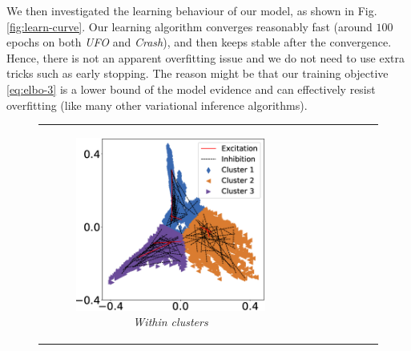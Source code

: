 We then investigated the learning behaviour of our model, as shown in Fig. \ref{fig:learn-curve}. Our learning algorithm converges reasonably fast (around $100$ epochs on both \textit{UFO} and \textit{Crash}), and then keeps stable after the convergence. Hence, there is not an apparent overfitting issue and we do not need to use extra tricks such as early stopping. The reason might be that our training objective \eqref{eq:elbo-3} is a lower bound of the model evidence and can effectively resist overfitting (like many other variational inference algorithms). 
\begin{figure}
	\vspace{-0.1in}
	\centering
	\setlength\tabcolsep{0.01pt}
	\begin{tabular}[c]{cc}
		\begin{subfigure}[t]{0.23\textwidth}
			\includegraphics[width=\textwidth]{./figs/lastfm_s3_inner.eps}
			\caption{\textit{Within clusters}}
		\end{subfigure} &
		\begin{subfigure}[t]{0.23\textwidth}

\end{subfigure}
\end{tabular}
\end{figure}
